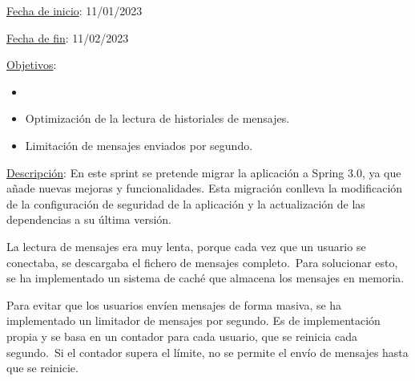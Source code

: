 
\underline{Fecha de inicio}: 11/01/2023

\underline{Fecha de fin}: 11/02/2023

\underline{Objetivos}:
\begin{itemize}
	\item {}
	\item Optimización de la lectura de historiales de mensajes.
	\item Limitación de mensajes enviados por segundo.
\end{itemize}

\underline{Descripción}:
En este sprint se pretende migrar la aplicación a Spring 3.0, ya que añade nuevas mejoras y funcionalidades.
Esta migración conlleva la modificación de la configuración de seguridad de la aplicación y la actualización de las
dependencias a su última versión.

La lectura de mensajes era muy lenta, porque cada vez que un usuario se conectaba,
se descargaba el fichero de mensajes completo.\ Para solucionar esto, se ha implementado un sistema de caché que
almacena los mensajes en memoria.

Para evitar que los usuarios envíen mensajes de forma masiva, se ha implementado un limitador de mensajes por segundo.
Es de implementación propia y se basa en un contador para cada usuario, que se reinicia cada segundo.\ Si el contador
supera el límite, no se permite el envío de mensajes hasta que se reinicie.


